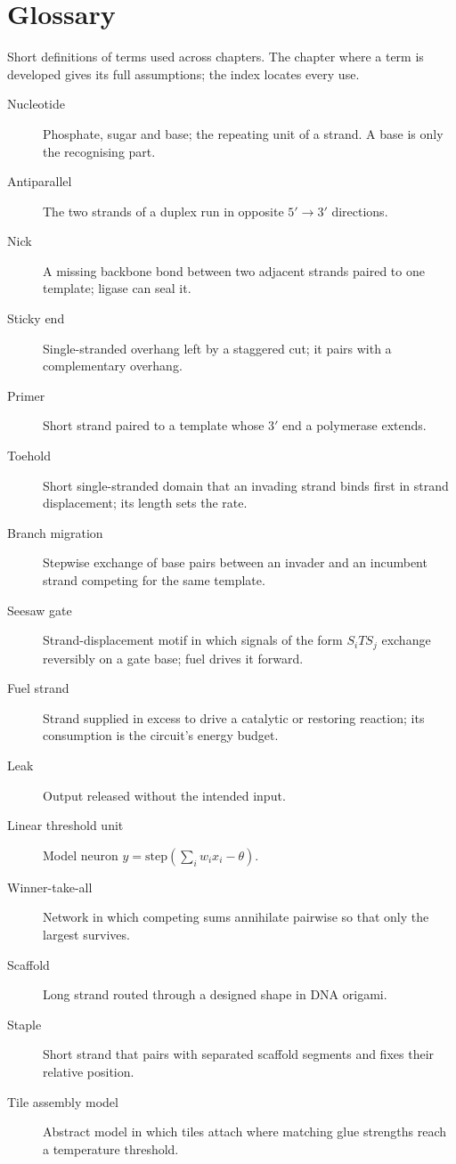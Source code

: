 \chapter*{Glossary}
Short definitions of terms used across chapters. The chapter where a term is
developed gives its full assumptions; the index locates every use.
\begin{description}
\item[Nucleotide] Phosphate, sugar and base; the repeating unit of a strand.
A base is only the recognising part.
\item[Antiparallel] The two strands of a duplex run in opposite $5'\to3'$
directions.
\item[Nick] A missing backbone bond between two adjacent strands paired to one
template; ligase can seal it.
\item[Sticky end] Single-stranded overhang left by a staggered cut; it pairs with
a complementary overhang.
\item[Primer] Short strand paired to a template whose $3'$ end a polymerase
extends.
\item[Toehold] Short single-stranded domain that an invading strand binds first
in strand displacement; its length sets the rate.
\item[Branch migration] Stepwise exchange of base pairs between an invader and an
incumbent strand competing for the same template.
\item[Seesaw gate] Strand-displacement motif in which signals of the form
$S_iTS_j$ exchange reversibly on a gate base; fuel drives it forward.
\item[Fuel strand] Strand supplied in excess to drive a catalytic or restoring
reaction; its consumption is the circuit's energy budget.
\item[Leak] Output released without the intended input.
\item[Linear threshold unit] Model neuron $y=\mathrm{step}(\sum_iw_ix_i-\theta)$.
\item[Winner-take-all] Network in which competing sums annihilate pairwise so
that only the largest survives.
\item[Scaffold] Long strand routed through a designed shape in DNA origami.
\item[Staple] Short strand that pairs with separated scaffold segments and fixes
their relative position.
\item[Tile assembly model] Abstract model in which tiles attach where matching
glue strengths reach a temperature threshold.

\end{description}

